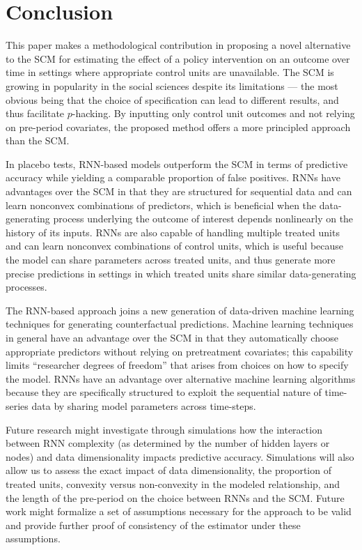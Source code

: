 \documentclass[hidelinks,12pt]{article}
\begin{document}
\citep{2017arXiv170301365S}

\section{Conclusion} \label{conclusion}

This paper makes a methodological contribution in proposing a novel alternative to the SCM for estimating the effect of a policy intervention on an outcome over time in settings where appropriate control units are unavailable. The SCM is growing in popularity in the social sciences despite its limitations --- the most obvious being that the choice of specification can lead to different results, and thus facilitate $p$-hacking. By inputting only control unit outcomes and not relying on pre-period covariates, the proposed method offers a more principled approach than the SCM. 

In placebo tests, RNN-based models outperform the SCM in terms of predictive accuracy while yielding a comparable proportion of false positives. RNNs have advantages over the SCM in that they are structured for sequential data and can learn nonconvex combinations of predictors, which is beneficial when the data-generating process underlying the outcome of interest depends nonlinearly on the history of its inputs. RNNs are also capable of handling multiple treated units and can learn nonconvex combinations of control units, which is useful because the model can share parameters across treated units, and thus generate more precise predictions in settings in which treated units share similar data-generating processes.

The RNN-based approach joins a new generation of data-driven machine learning techniques for generating counterfactual predictions. Machine learning techniques in general have an advantage over the SCM in that they automatically choose appropriate predictors without relying on pretreatment covariates; this capability limits ``researcher degrees of freedom'' that arises from choices on how to specify the model. RNNs have an advantage over alternative machine learning algorithms because they are specifically structured to exploit the sequential nature of time-series data by sharing model parameters across time-steps.

Future research might investigate through simulations how the interaction between RNN complexity (as determined by the number of hidden layers or nodes) and data dimensionality impacts predictive accuracy. Simulations will also allow us to assess the exact impact of data dimensionality, the proportion of treated units, convexity versus non-convexity in the modeled relationship, and the length of the pre-period on the choice between RNNs and the SCM. Future work might formalize a set of assumptions necessary for the approach to be valid and provide further proof of consistency of the estimator under these assumptions.

\newpage


\begin{singlespace}
	\begin{footnotesize}
		\begin{multicols}{2}
			
		\end{multicols}
	\end{footnotesize}
\end{singlespace}

\itemize
\end{document}
